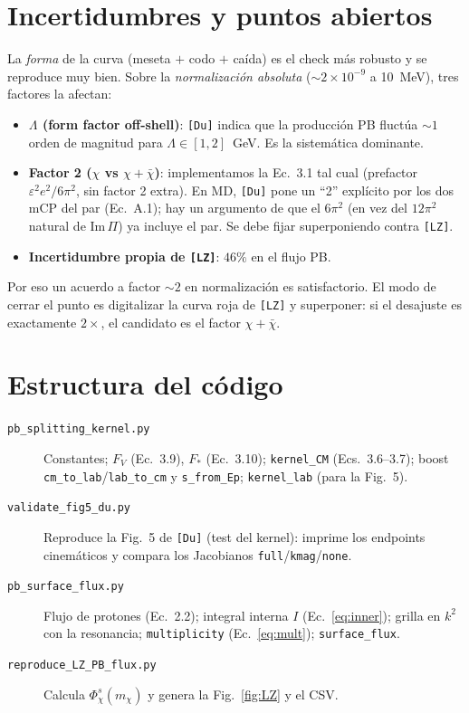 \documentclass[11pt,a4paper]{article}
\newcommand{\mchi}{m_\chi}
\newcommand{\eps}{\varepsilon}
\newcommand{\Du}{\texttt{[Du]}}
\newcommand{\LZ}{\texttt{[LZ]}}
\begin{document}
\section{Incertidumbres y puntos abiertos}

La \emph{forma} de la curva (meseta $+$ codo $+$ ca\'ida) es el check m\'as
robusto y se reproduce muy bien. Sobre la \emph{normalizaci\'on absoluta}
($\sim2\times10^{-9}$ a \SI{10}{MeV}), tres factores la afectan:
\begin{itemize}
\item \textbf{$\Lambda$ (form factor off-shell)}: \Du{} indica que la
producci\'on PB fluct\'ua $\sim\!1$ orden de magnitud para
$\Lambda\in[1,2]$~GeV. Es la sistem\'atica dominante.
\item \textbf{Factor 2 ($\chi$ vs $\chi+\bar\chi$)}: implementamos la Ec.~3.1
tal cual (prefactor $\eps^2 e^2/6\pi^2$, sin factor 2 extra). En MD, \Du{}
pone un ``2'' expl\'icito por los dos mCP del par (Ec.~A.1); hay un argumento
de que el $6\pi^2$ (en vez del $12\pi^2$ natural de $\mathrm{Im}\,\Pi$) ya
incluye el par. Se debe fijar superponiendo contra \LZ.
\item \textbf{Incertidumbre propia de \LZ}: $46\%$ en el flujo PB.
\end{itemize}
Por eso un acuerdo a factor $\sim\!2$ en normalizaci\'on es satisfactorio. El
modo de cerrar el punto es digitalizar la curva roja de \LZ{} y superponer:
si el desajuste es exactamente $2\times$, el candidato es el factor
$\chi+\bar\chi$.

\section{Estructura del c\'odigo}

\begin{description}
\item[\texttt{pb\_splitting\_kernel.py}] Constantes; $F_V$ (Ec.~3.9),
$F_\ast$ (Ec.~3.10); \texttt{kernel\_CM} (Ecs.~3.6--3.7); boost
\texttt{cm\_to\_lab}/\texttt{lab\_to\_cm} y \texttt{s\_from\_Ep};
\texttt{kernel\_lab} (para la Fig.~5).
\item[\texttt{validate\_fig5\_du.py}] Reproduce la Fig.~5 de \Du{} (test del
kernel): imprime los endpoints cinem\'aticos y compara los Jacobianos
\texttt{full}/\texttt{kmag}/\texttt{none}.
\item[\texttt{pb\_surface\_flux.py}] Flujo de protones (Ec.~2.2); integral
interna $I$ (Ec.~\ref{eq:inner}); grilla en $k^2$ con la resonancia;
\texttt{multiplicity} (Ec.~\ref{eq:mult}); \texttt{surface\_flux}.
\item[\texttt{reproduce\_LZ\_PB\_flux.py}] Calcula $\Phi_\chi^s(\mchi)$ y
genera la Fig.~\ref{fig:LZ} y el CSV.
\end{description}
\end{document}
